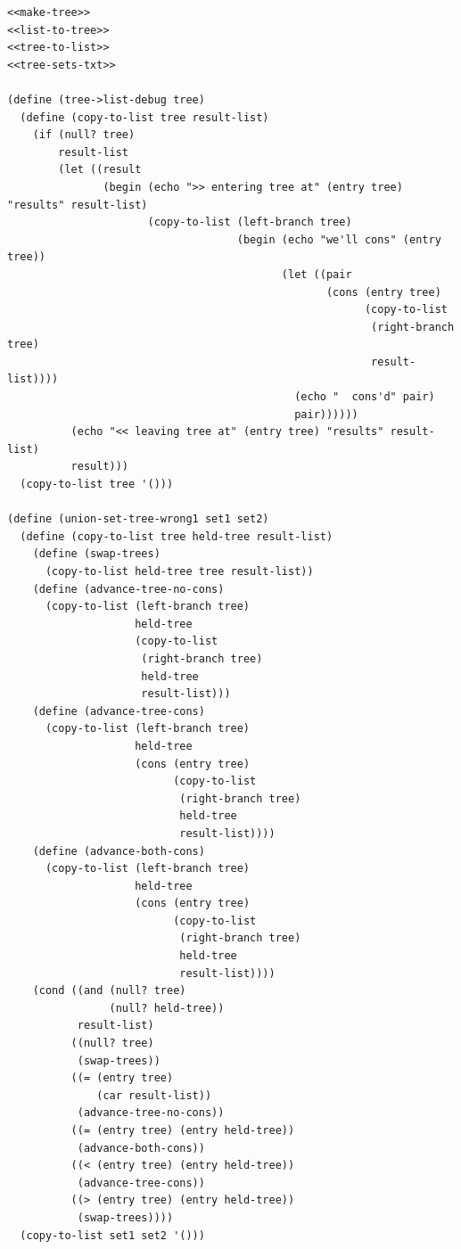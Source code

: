 \documentclass[final,fleqn,titlepage,twoside]{article}
\begin{document}
\begin{verbatim}
<<make-tree>>
<<list-to-tree>>
<<tree-to-list>>
<<tree-sets-txt>>

(define (tree->list-debug tree)
  (define (copy-to-list tree result-list)
    (if (null? tree)
        result-list
        (let ((result
               (begin (echo ">> entering tree at" (entry tree) "results" result-list)
                      (copy-to-list (left-branch tree)
                                    (begin (echo "we'll cons" (entry tree))
                                           (let ((pair
                                                  (cons (entry tree)
                                                        (copy-to-list
                                                         (right-branch tree)
                                                         result-list))))
                                             (echo "  cons'd" pair)
                                             pair))))))
          (echo "<< leaving tree at" (entry tree) "results" result-list)
          result)))
  (copy-to-list tree '()))

(define (union-set-tree-wrong1 set1 set2)
  (define (copy-to-list tree held-tree result-list)
    (define (swap-trees)
      (copy-to-list held-tree tree result-list))
    (define (advance-tree-no-cons)
      (copy-to-list (left-branch tree)
                    held-tree
                    (copy-to-list
                     (right-branch tree)
                     held-tree
                     result-list)))
    (define (advance-tree-cons)
      (copy-to-list (left-branch tree)
                    held-tree
                    (cons (entry tree)
                          (copy-to-list
                           (right-branch tree)
                           held-tree
                           result-list))))
    (define (advance-both-cons)
      (copy-to-list (left-branch tree)
                    held-tree
                    (cons (entry tree)
                          (copy-to-list
                           (right-branch tree)
                           held-tree
                           result-list))))
    (cond ((and (null? tree)
                (null? held-tree))
           result-list)
          ((null? tree)
           (swap-trees))
          ((= (entry tree)
              (car result-list))
           (advance-tree-no-cons))
          ((= (entry tree) (entry held-tree))
           (advance-both-cons))
          ((< (entry tree) (entry held-tree))
           (advance-tree-cons))
          ((> (entry tree) (entry held-tree))
           (swap-trees))))
  (copy-to-list set1 set2 '()))


\end{verbatim}
\end{document}
